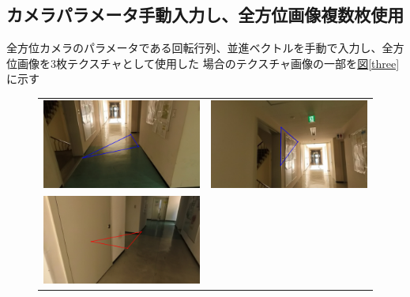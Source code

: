 \documentclass[]{jarticle}          %
\begin{document}
\subsection{カメラパラメータ手動入力し、全方位画像複数枚使用}
全方位カメラのパラメータである回転行列、並進ベクトルを手動で入力し、全方位画像を3枚テクスチャとして使用した
場合のテクスチャ画像の一部を\hyperref[three]{図\ref{three}}に示す

\begin{figure}[H]
  \begin{center}
    \begin{tabular}{cc}
      \includegraphics[keepaspectratio, scale=0.1]{figures/texture2/texture/texture_0_3.png}&
      \includegraphics[keepaspectratio, scale=0.1]{figures/texture2/texture/texture_0_15.png}\\
      \includegraphics[keepaspectratio, scale=0.1]{figures/texture2/texture/texture_2_2.png}&

\end{tabular}
\end{center}
\end{figure}
\end{document}

